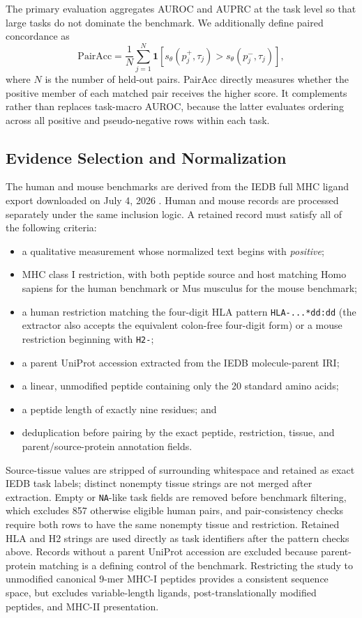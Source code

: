 The primary evaluation aggregates AUROC and AUPRC at the task level so that large tasks do not dominate the benchmark. We additionally define paired concordance as
\[
\mathrm{PairAcc}
=
\frac{1}{N}
\sum_{j=1}^{N}
\mathbf{1}
\left[
s_{\theta}(p_j^{+},\tau_j)
>
s_{\theta}(p_j^{-},\tau_j)
\right],
\]
where \(N\) is the number of held-out pairs. PairAcc directly measures whether the positive member of each matched pair receives the higher score. It complements rather than replaces task-macro AUROC, because the latter evaluates ordering across all positive and pseudo-negative rows within each task.

\subsection{Evidence Selection and Normalization}

The human and mouse benchmarks are derived from the IEDB full MHC ligand export downloaded on July 4, 2026 \cite{vita2025iedb}. Human and mouse records are processed separately under the same inclusion logic. A retained record must satisfy all of the following criteria:

\begin{itemize}
    \item a qualitative measurement whose normalized text begins with \emph{positive};
    \item MHC class I restriction, with both peptide source and host matching Homo sapiens for the human benchmark or Mus musculus for the mouse benchmark;
    \item a human restriction matching the four-digit HLA pattern \texttt{HLA-...*dd:dd} (the extractor also accepts the equivalent colon-free four-digit form) or a mouse restriction beginning with \texttt{H2-};
    \item a parent UniProt accession extracted from the IEDB molecule-parent IRI;
    \item a linear, unmodified peptide containing only the 20 standard amino acids;
    \item a peptide length of exactly nine residues; and
    \item deduplication before pairing by the exact peptide, restriction, tissue, and parent/source-protein annotation fields.
\end{itemize}

Source-tissue values are stripped of surrounding whitespace and retained as exact IEDB task labels; distinct nonempty tissue strings are not merged after extraction. Empty or \texttt{NA}-like task fields are removed before benchmark filtering, which excludes 857 otherwise eligible human pairs, and pair-consistency checks require both rows to have the same nonempty tissue and restriction. Retained HLA and H2 strings are used directly as task identifiers after the pattern checks above. Records without a parent UniProt accession are excluded because parent-protein matching is a defining control of the benchmark. Restricting the study to unmodified canonical 9-mer MHC-I peptides provides a consistent sequence space, but excludes variable-length ligands, post-translationally modified peptides, and MHC-II presentation.

